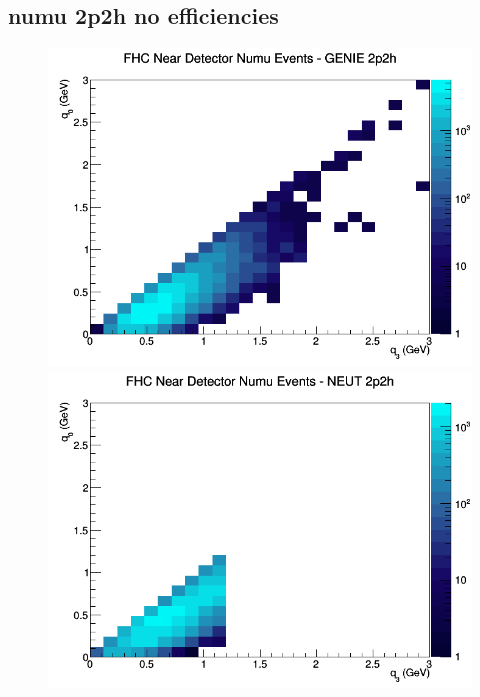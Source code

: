 \documentclass[12pt]{article}
\begin{document}
\subsection{numu 2p2h no efficiencies}
\begin{figure}[h]
\includegraphics[width=\linewidth]{q0_q3/nominal/2p2h_FHC_ND_numu_q3_q0_GENIE.png}
\endminipage
{}
\includegraphics[width=\linewidth]{q0_q3/nominal/2p2h_FHC_ND_numu_q3_q0_NEUT.png}
\endminipage
{}

\end{figure}
\end{document}
